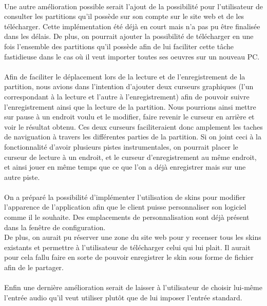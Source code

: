 \paragraph{}
Une autre amélioration possible serait l'ajout de la possibilité pour l'utilisateur de consulter les partitions qu'il possède sur son compte sur le site web et de les télécharger. Cette implémentation été déjà en court mais n'a pas pu être finalisée dans les délais.
De plus, on pourrait ajouter la possibilité de télécharger en une fois l'ensemble des partitions qu'il possède afin de lui faciliter cette tâche fastidieuse dans le cas où il veut importer toutes ses oeuvres sur un nouveau PC.

\paragraph{}
Afin de faciliter le déplacement lors de la lecture et de l'enregistrement de la partition, nous avions dans l'intention d'ajouter 
deux curseurs graphiques (l'un correspondant à la lecture et l'autre à l'enregistrement) afin de pouvoir suivre l'enregistrement ainsi que 
la lecture de la partition. Nous pourrions ainsi mettre sur pause à un endroit voulu et le modifier, faire revenir le curseur en arrière et 
voir le résultat obtenu. Ces deux curseurs faciliteraient donc amplement les taches de naviguation à travers les différentes parties de la partition. 
Si on joint ceci à la fonctionnalité d'avoir plusieurs pistes instrumentales, on pourrait placer le curseur de lecture à un endroit, et le curseur 
d'enregistrement au même endroit, et ainsi jouer en même temps que ce que l'on a déjà enregistrer mais sur une autre piste.

\paragraph{}
On a préparé la possibilité d'implémenter l'utilisation de skins pour modifier l'apparence de l'application afin que le client puisse personnaliser son logiciel comme il le souhaite. Des emplacements de personnalisation sont déjà présent dans la fenêtre de configuration.\\
De plus, on aurait pu réserver une zone du site web pour y recenser tous les skins existants et permettre à l'utilisateur de télécharger celui qui lui plait. 
Il aurait pour cela fallu faire en sorte de pouvoir enregistrer le skin sous forme de fichier afin de le partager. 

\paragraph{}
Enfin une dernière amélioration serait de laisser à l'utilisateur de choisir lui-même l'entrée audio qu'il veut utiliser plutôt que de lui imposer l'entrée standard.
